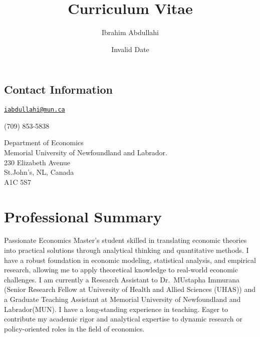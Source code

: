 \documentclass[
  letterpaper,
  DIV=11,
  numbers=noendperiod]{scrartcl}
\title{Curriculum Vitae}
\author{Ibrahim Abdullahi}
\date{Invalid Date}
\begin{document}
\maketitle
\ifdefined\Shaded\renewenvironment{Shaded}{\begin{tcolorbox}[sharp corners, breakable, interior hidden, boxrule=0pt, borderline west={3pt}{0pt}{shadecolor}, enhanced, frame hidden]}{\end{tcolorbox}}\fi

\hypertarget{contact-information}{%
\subsection{Contact Information}\label{contact-information}}

\href{mailto:iabdullahi@mun.ca}{\nolinkurl{iabdullahi@mun.ca}}

 (709) 853-5838

Department of Economics\\
\hspace*{0.333em}\hspace*{0.333em}\hspace*{0.333em}\hspace*{0.333em}
Memorial University of Newfoundland and Labrador.\\
\hspace*{0.333em}\hspace*{0.333em}\hspace*{0.333em}\hspace*{0.333em} 230
Elizabeth Avenue\\
\hspace*{0.333em}\hspace*{0.333em}\hspace*{0.333em}\hspace*{0.333em}
St.John's, NL, Canada\\
\hspace*{0.333em}\hspace*{0.333em}\hspace*{0.333em}\hspace*{0.333em} A1C
5S7

\hypertarget{professional-summary}{%
\section{Professional Summary}\label{professional-summary}}

Passionate Economics Master's student skilled in translating economic
theories into practical solutions through analytical thinking and
quantitative methods. I have a robust foundation in economic modeling,
statistical analysis, and empirical research, allowing me to apply
theoretical knowledge to real-world economic challenges. I am currently
a Research Assistant to Dr.~MUstapha Immurana (Senior Research Fellow at
University of Health and Allied Sciences (UHAS)) and a Graduate Teaching
Assistant at Memorial University of Newfoundland and Labrador(MUN). I
have a long-standing experience in teaching. Eager to contribute my
academic rigor and analytical expertise to dynamic research or
policy-oriented roles in the field of economics.
\end{document}

